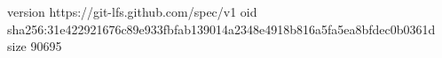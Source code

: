 version https://git-lfs.github.com/spec/v1
oid sha256:31e422921676c89e933fbfab139014a2348e4918b816a5fa5ea8bfdec0b0361d
size 90695

